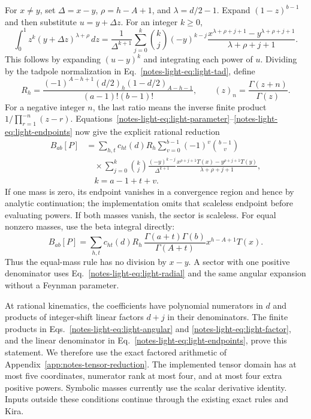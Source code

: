 \documentclass[11pt,a4paper]{article}
\begin{document}
For $x\ne y$, set $\Delta=x-y$, $\rho=h-A+1$, and $\lambda=d/2-1$. Expand $(1-z)^{b-1}$ and then substitute $u=y+\Delta z$. For an integer $k\ge0$,
\begin{equation}
 \int_0^1 z^k(y+\Delta z)^{\lambda+\rho}\,dz
 =\frac{1}{\Delta^{k+1}}\sum_{j=0}^k\binom{k}{j}(-y)^{k-j}
 \frac{x^{\lambda+\rho+j+1}-y^{\lambda+\rho+j+1}}{\lambda+\rho+j+1}.
 \label{notes-light-eq:light-endpoints}
\end{equation}
This follows by expanding $(u-y)^k$ and integrating each power of $u$. Dividing by the tadpole normalization in Eq.~\eqref{notes-light-eq:light-tad}, define
\begin{equation}
 R_h=\frac{(-1)^{A-h+1}(d/2)_h(1-d/2)_{A-h-1}}{(a-1)!(b-1)!},
 \qquad (z)_n=\frac{\Gamma(z+n)}{\Gamma(z)}.
 \label{notes-light-eq:light-factor}
\end{equation}
For a negative integer $n$, the last ratio means the inverse finite product $1/\prod_{r=1}^{-n}(z-r)$. Equations~\eqref{notes-light-eq:light-parameter}--\eqref{notes-light-eq:light-endpoints} now give the explicit rational reduction
\begin{align}
 B_{ab}[P]&=\sum_{h,t}c_{ht}(d)R_h\sum_{v=0}^{b-1}(-1)^v\binom{b-1}{v}
 \nonumber\\ &\quad\times\sum_{j=0}^{k}\binom{k}{j}\frac{(-y)^{k-j}}{\Delta^{k+1}}
 \frac{x^{\rho+j+1}T(x)-y^{\rho+j+1}T(y)}{\lambda+\rho+j+1},\nonumber\\[-2pt]
 &\quad k=a-1+t+v.
 \label{notes-light-eq:light-final}
\end{align}
If one mass is zero, its endpoint vanishes in a convergence region and hence by analytic continuation; the implementation omits that scaleless endpoint before evaluating powers. If both masses vanish, the sector is scaleless. For equal nonzero masses, use the beta integral directly:
\begin{equation}
 B_{ab}[P]=\sum_{h,t}c_{ht}(d)R_h\,
 \frac{\Gamma(a+t)\Gamma(b)}{\Gamma(A+t)}x^{h-A+1}T(x).
 \label{notes-light-eq:light-equal-tensor}
\end{equation}
Thus the equal-mass rule has no division by $x-y$. A sector with one positive denominator uses Eq.~\eqref{notes-light-eq:light-radial} and the same angular expansion without a Feynman parameter.

At rational kinematics, the coefficients have polynomial numerators in $d$ and products of integer-shift linear factors $d+j$ in their denominators. The finite products in Eqs.~\eqref{notes-light-eq:light-angular} and \eqref{notes-light-eq:light-factor}, and the linear denominator in Eq.~\eqref{notes-light-eq:light-endpoints}, prove this statement. We therefore use the exact factored arithmetic of Appendix~\ref{app:notes-tensor-reduction}. The implemented tensor domain has at most five coordinates, numerator rank at most four, and at most four extra positive powers. Symbolic masses currently use the scalar derivative identity. Inputs outside these conditions continue through the existing exact rules and Kira.
\end{document}

